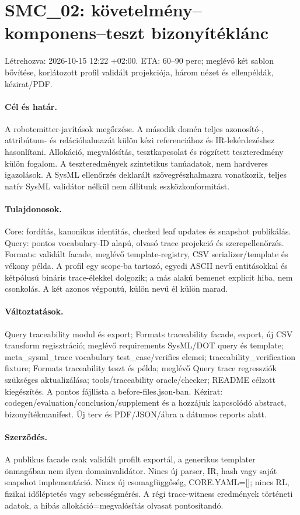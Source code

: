 \documentclass[11pt,a4paper]{article}
\begin{document}
\section*{SMC\_02: követelmény--komponens--teszt bizonyítéklánc}
Létrehozva: 2026-10-15 12:22 +02:00. ETA: 60--90 perc; meglévő két sablon bővítése, korlátozott profil validált projekciója, három nézet és ellenpéldák, kézirat/PDF.
\paragraph{Cél és határ.} A robotemitter-javítások megőrzése. A második domén teljes azonosító-, attribútum- és relációhalmazát külön kézi referenciához és IR-lekérdezéshez hasonlítani. Allokáció, megvalósítás, tesztkapcsolat és rögzített teszteredmény külön fogalom. A teszteredmények szintetikus tanúadatok, nem hardveres igazolások. A SysML ellenőrzés deklarált szövegrészhalmazra vonatkozik, teljes natív SysML validátor nélkül nem állítunk eszközkonformitást.
\paragraph{Tulajdonosok.} Core: fordítás, kanonikus identitás, checked leaf updates és snapshot publikálás. Query: pontos vocabulary-ID alapú, olvasó trace projekció és szerepellenőrzés. Formats: validált facade, meglévő template-registry, CSV serializer/template és vékony példa. A profil egy scope-ba tartozó, egyedi ASCII nevű entitásokkal és kétpólusú bináris trace-élekkel dolgozik; a más alakú bemenet explicit hiba, nem csonkolás. A két azonos végpontú, külön nevű él külön marad.
\paragraph{Változtatások.} Query traceability modul és export; Formats traceability facade, export, új CSV transform regisztráció; meglévő requirements SysML/DOT query és template; meta\_sysml\_trace vocabulary test\_case/verifies elemei; traceability\_verification fixture; Formats traceability teszt és példa; meglévő Query trace regressziók szükséges aktualizálása; tools/traceability oracle/checker; README célzott kiegészítés. A pontos fájllista a before-files.json-ban. Kézirat: codegen/evaluation/conclusion/supplement és a hozzájuk kapcsolódó abstract, bizonyítékmanifest. Új terv és PDF/JSON/ábra a dátumos reports alatt.
\paragraph{Szerződés.} A publikus facade csak validált profilt exportál, a generikus templater önmagában nem ilyen domainvalidátor. Nincs új parser, IR, hash vagy saját snapshot implementáció. Nincs új csomagfüggőség, CORE.YAML=[]; nincs RL, fizikai időléptetés vagy sebességmérés. A régi trace-witness eredmények történeti adatok, a hibás allokáció=megvalósítás olvasat pontosítandó.
\end{document}
